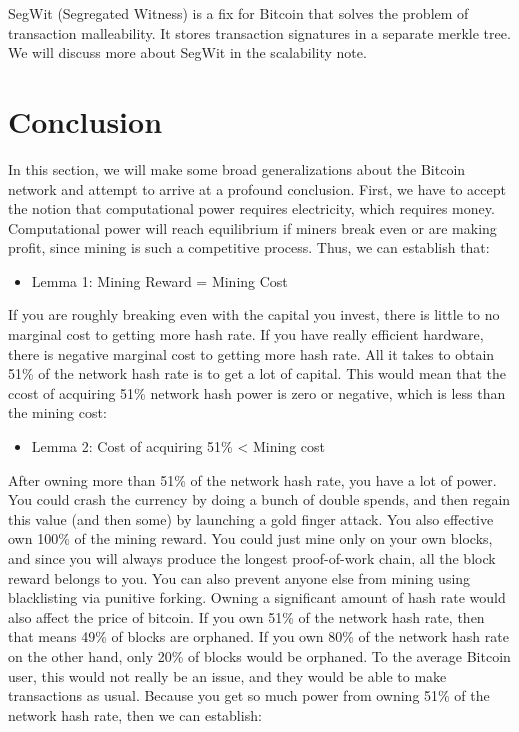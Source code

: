 \documentclass[full.tex]{subfiles}
\begin{document}
    SegWit (Segregated Witness) is a fix for Bitcoin that solves the problem of transaction malleability. It stores transaction signatures in a separate merkle tree. We will discuss more about SegWit in the scalability note.
    
    
    \section*{Conclusion}
    
    In this section, we will make some broad generalizations about the Bitcoin network and attempt to arrive at a profound conclusion. First, we have to accept the notion that computational power requires electricity, which requires money. Computational power will reach equilibrium if miners break even or are making profit, since mining is such a competitive process. Thus, we can establish that:
    
    \begin{itemize}
        \item Lemma 1: Mining Reward = Mining Cost
    \end{itemize}
    
    If you are roughly breaking even with the capital you invest, there is little to no marginal cost to getting more hash rate.  If you have really efficient hardware, there is negative marginal cost to getting more hash rate. All it takes to obtain 51\% of the network hash rate is to get a lot of capital. This would mean that the ccost of acquiring 51\% network hash power is zero or negative, which is less than the mining cost:
    
    \begin{itemize}
        \item Lemma 2: Cost of acquiring 51\% < Mining cost
    \end{itemize}
    
    After owning more than 51\% of the network hash rate, you have a lot of power. You could crash the currency by doing a bunch of double spends, and then regain this value (and then some) by launching a gold finger attack. You also effective own 100\% of the mining reward. You could just mine only on your own blocks, and since you will always produce the longest proof-of-work chain, all the block reward belongs to you. You can also prevent anyone else from mining using blacklisting via punitive forking. Owning a significant amount of hash rate would also affect the price of bitcoin. If you own 51\% of the network hash rate, then that means 49\% of blocks are orphaned. If you own 80\% of the network hash rate on the other hand, only 20\% of blocks would be orphaned. To the average Bitcoin user, this would not really be an issue, and they would be able to make transactions as usual. Because you get so much power from owning 51\% of the network hash rate, then we can establish:
    
\end{document}
